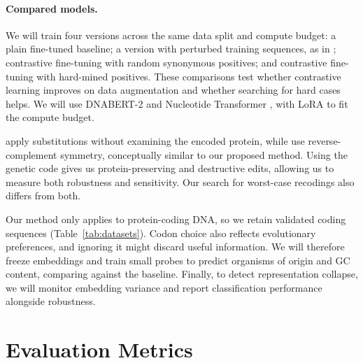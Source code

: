 \documentclass{article}
\begin{document}
\paragraph{Compared models.}
We will train four versions across the same data split and compute
budget: a plain fine-tuned baseline; a version with perturbed
training sequences, as in \citet{yoo2024exploring}; contrastive
fine-tuning with random synonymous positives; and contrastive
fine-tuning with hard-mined positives. These comparisons test whether
contrastive learning improves on data augmentation and whether
searching for hard cases helps. We will use DNABERT-2
\citep{zhou2024dnabert2} and Nucleotide Transformer
\citep{dalla2025nucleotide}, with LoRA to fit the compute budget.


\citet{yoo2024exploring} apply substitutions without examining the
encoded protein, while \citet{ma2025rccr} use reverse-complement
symmetry, conceptually similar to our proposed method. Using the genetic code gives us
protein-preserving and destructive edits, allowing us to measure
both robustness and sensitivity. Our search for worst-case
recodings also differs from both.

Our method only applies to protein-coding DNA, so we retain validated
coding sequences (Table~\ref{tab:datasets}). Codon choice also reflects
evolutionary preferences, and ignoring it might discard useful information.
We will therefore freeze embeddings and train small probes to predict
organisms of origin and GC content, comparing against the baseline.
Finally, to detect representation collapse, we will monitor embedding
variance and report classification performance alongside robustness.

\section{Evaluation Metrics}
\label{sec:evaluation}

\end{document}
